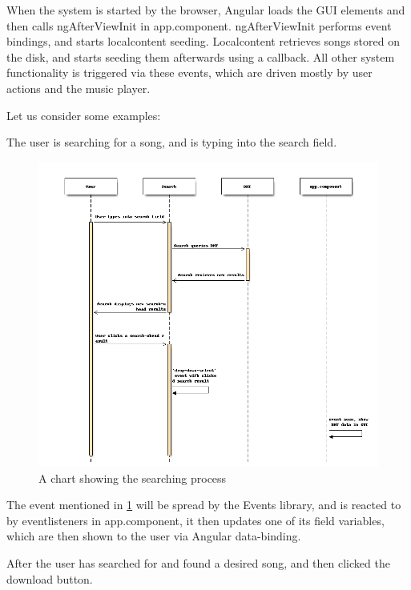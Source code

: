 When the system is started by the browser,
Angular loads the \acs{GUI} elements and then calls ngAfterViewInit in app.component.
ngAfterViewInit performs event bindings, and starts localcontent seeding.
Localcontent retrieves songs stored on the disk, and starts seeding them afterwards using a callback.
All other system functionality is triggered via these events, 
which are driven mostly by user actions and the music player.
\newline

Let us consider some examples: 

The user is searching for a song, and is typing into the search field.

\begin{figure}[H]
	\centerline{
	\includegraphics[width=1.5\linewidth]{gfx/searchsong.png}
	}
	\caption{A chart showing the searching process}
	\label{fig:searchsong}
\end{figure}

The event mentioned in \ref{fig:searchsong} will be spread by the Events library,
and is reacted to by eventlisteners in app.component, 
it then updates one of its field variables,
which are then shown to the user via Angular data-binding.

After the user has searched for and found a desired song,
and then clicked the download button.

